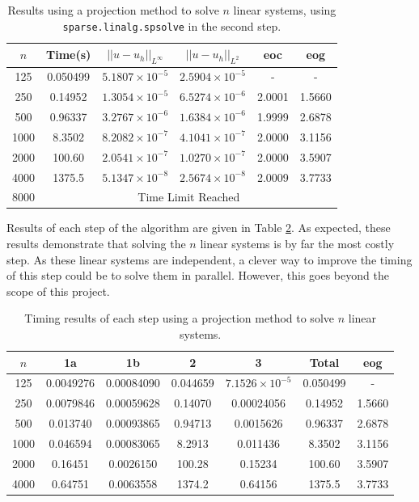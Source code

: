 \documentclass[11pt]{article}
\numberwithin{equation}{section}
\begin{document}
\begin{table}[H]
\centering
\begin{tabular}{|c|c|c|c|c|c|}
\hline
$n$ & Time(s) & $|| u - u_h ||_{L^{\infty}}$ &$|| u - u_h ||_{L^{2}}$ & eoc & eog \\
\hline
125 & 0.050499 & $5.1807 \times 10^{-5}$ & $2.5904 \times 10^{-5}$ & - & - \\
250 & 0.14952 & $1.3054 \times 10^{-5}$ & $6.5274 \times 10^{-6}$ & 2.0001  & 1.5660 \\
500 & 0.96337 & $3.2767 \times 10^{-6}$ & $1.6384 \times 10^{-6}$ & 1.9999  & 2.6878 \\
1000 & 8.3502 & $8.2082 \times 10^{-7}$ & $4.1041 \times 10^{-7}$ & 2.0000 & 3.1156 \\
2000 & 100.60 & $2.0541 \times 10^{-7}$ & $1.0270 \times 10^{-7}$ & 2.0000 & 3.5907 \\
4000 & 1375.5 & $5.1347 \times 10^{-8}$ & $2.5674 \times 10^{-8}$ & 2.0009 & 3.7733  \\
\cline{2-6} 
8000 & \multicolumn{5}{c|}{Time Limit Reached} \\
\hline
\end{tabular}
\captionsetup{justification=centering}
\caption{Results using a projection method to solve $n$ linear systems, using \texttt{sparse.linalg.spsolve} in the second step.}
\label{table:shifted sys}
\end{table}

Results of each step of the algorithm are given in Table \ref{table:shifted sys steps}. As expected, these results demonstrate that solving the $n$ linear systems is by far the most costly step. As these linear systems are independent, a clever way to improve the timing of this step could be to solve them in parallel. However, this goes beyond the scope of this project.

\begin{table}[H]
\centering
\begin{tabular}{|c|c|c|c|c|c|c|}
\hline
$n$ & 1a & 1b & 2 & 3 & Total & eog \\
\hline
125 & 0.0049276 & 0.00084090 & 0.044659 & $7.1526 \times 10^{-5}$ & 0.050499 & - \\
250 & 0.0079846 & 0.00059628 & 0.14070 & 0.00024056 & 0.14952 & 1.5660 \\
500 & 0.013740 & 0.00093865 & 0.94713 & 0.0015626 & 0.96337 & 2.6878 \\
1000 & 0.046594 & 0.00083065 & 8.2913 & 0.011436 & 8.3502 & 3.1156 \\
2000 & 0.16451 & 0.0026150 & 100.28 & 0.15234 & 100.60 & 3.5907\\
4000 & 0.64751 & 0.0063558 & 1374.2 & 0.64156 & 1375.5 & 3.7733\\
\hline
\end{tabular}
\captionsetup{justification=centering}
\caption{Timing results of each step using a projection method to solve $n$ linear systems.}
\label{table:shifted sys steps}
\end{table}
\end{document}
